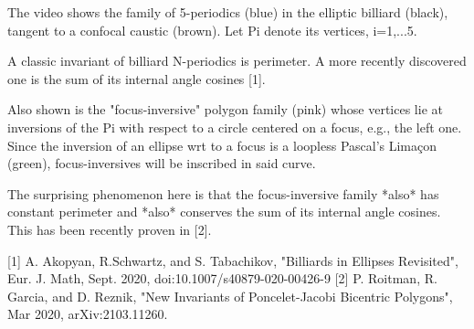 The video shows the family of 5-periodics (blue) in the elliptic billiard (black), tangent to a confocal caustic (brown). Let Pi denote its vertices, i=1,...5.

A classic invariant of billiard N-periodics is perimeter. A more recently discovered one is the sum of its internal angle cosines [1].

Also shown is the "focus-inversive" polygon family (pink) whose vertices lie at inversions of the Pi with respect to a circle centered on a focus, e.g., the left one. Since the inversion of an ellipse wrt to a focus is a loopless Pascal's Limaçon (green), focus-inversives will be inscribed in said curve.

The surprising phenomenon here is that the focus-inversive family *also* has constant perimeter and *also* conserves the sum of its internal angle cosines. This has been recently proven in [2].

[1] A. Akopyan, R.Schwartz, and S. Tabachikov, "Billiards in Ellipses Revisited", Eur. J. Math, Sept. 2020, doi:10.1007/s40879-020-00426-9
[2] P. Roitman, R. Garcia, and D. Reznik, "New Invariants of Poncelet-Jacobi Bicentric Polygons", Mar 2020, arXiv:2103.11260.